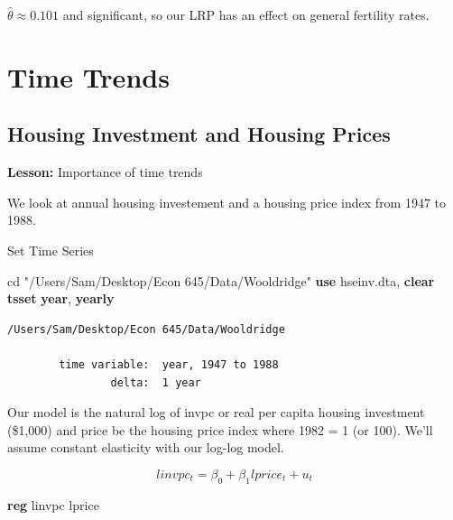 \documentclass[
]{book}
\newenvironment{Shaded}{\begin{snugshade}}{\end{snugshade}}
\newcommand{\FunctionTok}[1]{\textcolor[rgb]{0.13,0.29,0.53}{\textbf{#1}}}
\newcommand{\KeywordTok}[1]{\textcolor[rgb]{0.13,0.29,0.53}{\textbf{#1}}}
\newcommand{\NormalTok}[1]{#1}
\newcommand{\StringTok}[1]{\textcolor[rgb]{0.31,0.60,0.02}{#1}}
\begin{document}
\(\hat{\theta} \approx 0.101\) and significant, so our LRP has an effect on general fertility rates.

\chapter{Time Trends}\label{time-trends}

\section{Housing Investment and Housing Prices}\label{housing-investment-and-housing-prices}

\textbf{Lesson:} Importance of time trends

We look at annual housing investement and a housing price index from 1947 to 1988.

Set Time Series

\begin{Shaded}
\begin{Highlighting}[]
\NormalTok{cd }\StringTok{"/Users/Sam/Desktop/Econ 645/Data/Wooldridge"}
\KeywordTok{use}\NormalTok{ hseinv.dta, }\KeywordTok{clear}
\KeywordTok{tsset} \FunctionTok{year}\NormalTok{, }\FunctionTok{yearly}
\end{Highlighting}
\end{Shaded}

\begin{verbatim}
/Users/Sam/Desktop/Econ 645/Data/Wooldridge

        time variable:  year, 1947 to 1988
                delta:  1 year
\end{verbatim}

Our model is the natural log of invpc or real per capita housing investment (\$1,000)
and price be the housing price index where 1982 = 1 (or 100). We'll assume
constant elasticity with our log-log model.

\[ linvpc_t = \beta_0 + \beta_1 lprice_t + u_t \]

\begin{Shaded}
\begin{Highlighting}[]
\KeywordTok{reg}\NormalTok{ linvpc lprice}
\end{Highlighting}
\end{Shaded}
\end{document}
